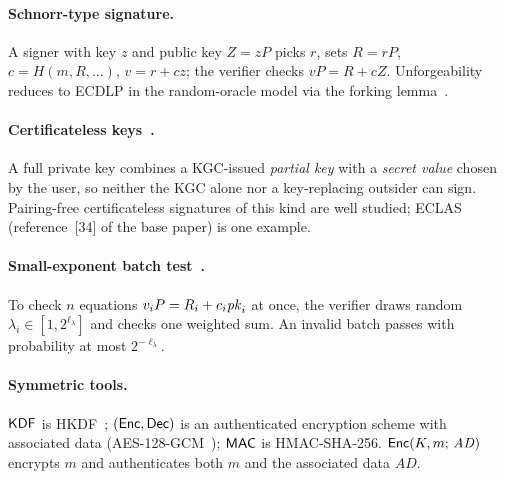 \paragraph{Schnorr-type signature.} A signer with key $z$ and public key $Z=zP$ picks $r$, sets $R=rP$, $c=H(m,R,\dots)$, $v=r+cz$; the verifier checks
$vP=R+cZ$. Unforgeability reduces to ECDLP in the random-oracle model via the forking lemma~\cite{schnorr,forking}.

\paragraph{Certificateless keys~\cite{alriyami}.} A full private key combines a KGC-issued \emph{partial key} with a \emph{secret value} chosen by the user,
so neither the KGC alone nor a key-replacing outsider can sign. Pairing-free certificateless signatures of this kind are well studied; ECLAS~\cite{eclas}
(reference~[34] of the base paper) is one example.

\paragraph{Small-exponent batch test~\cite{bgr}.} To check $n$ equations $v_iP=R_i+c_i\mathit{pk}_i$ at once, the verifier draws random
$\lambda_i\in[1,2^{\ell_\lambda}]$ and checks one weighted sum. An invalid batch passes with probability at most $2^{-\ell_\lambda}$.

\paragraph{Symmetric tools.} $\mathsf{KDF}$ is HKDF~\cite{hkdf}; $(\mathsf{Enc},\mathsf{Dec})$ is an authenticated encryption scheme with associated data (AES-128-GCM~\cite{gcm});
$\mathsf{MAC}$ is HMAC-SHA-256. $\mathsf{Enc}(K,m;\,\mathit{AD})$ encrypts $m$ and authenticates both $m$ and the associated data $\mathit{AD}$.

